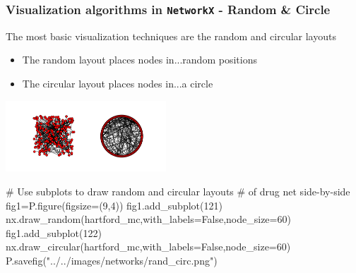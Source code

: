 \documentclass[xcolor=dvipsnames, 9pt]{beamer}
\begin{document}
\begin{frame}[fragile]
    \frametitle{Visualization algorithms in \texttt{NetworkX} - Random \& Circle}
    The most basic visualization techniques are the random and circular layouts
    \begin{itemize}
        \item The random layout places nodes in...random positions
        \item The circular layout places nodes in...a circle
    \end{itemize}
    \begin{center}
        \includegraphics[width=6cm,clip,trim=2cm 2cm 2cm 2cm]{../images/networks/rand_circ.png}
    \end{center}
    \begin{block}{}
        \begin{code}
# Use subplots to draw random and circular layouts
# of drug net side-by-side
\alert<2>{fig1=P.figure(figsize=(9,4))
fig1.add_subplot(121)}
\alert<3>{nx.draw_random(hartford_mc,with_labels=False,node_size=60)}
\alert<4>{fig1.add_subplot(122)
nx.draw_circular(hartford_mc,with_labels=False,node_size=60)
P.savefig("../../images/networks/rand_circ.png")}
        \end{code}
    \end{block}
\end{frame}
\end{document}
